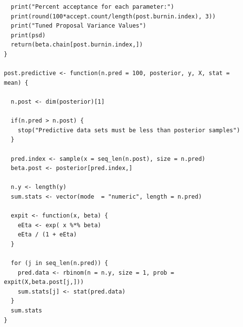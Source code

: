 \documentclass[11pt]{amsart}
\begin{document}
\begin{verbatim}
  print("Percent acceptance for each parameter:")
  print(round(100*accept.count/length(post.burnin.index), 3))  
  print("Tuned Proposal Variance Values")
  print(psd)
  return(beta.chain[post.burnin.index,])
}

post.predictive <- function(n.pred = 100, posterior, y, X, stat = mean) {
  
  n.post <- dim(posterior)[1]
  
  if(n.pred > n.post) {
    stop("Predictive data sets must be less than posterior samples")
  }
  
  pred.index <- sample(x = seq_len(n.post), size = n.pred)
  beta.post <- posterior[pred.index,]
  
  n.y <- length(y)
  sum.stats <- vector(mode  = "numeric", length = n.pred)
  
  expit <- function(x, beta) {
    eEta <- exp( x %*% beta) 
    eEta / (1 + eEta)
  }
  
  for (j in seq_len(n.pred)) {
    pred.data <- rbinom(n = n.y, size = 1, prob = expit(X,beta.post[j,]))
    sum.stats[j] <- stat(pred.data)
  } 
  sum.stats
}

\end{verbatim}


\newpage
\end{document}
